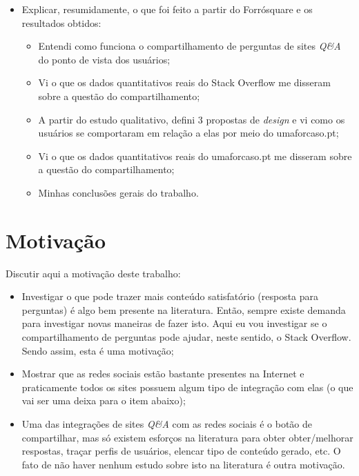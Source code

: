 \begin{itemize}
\begin{itemize}
            \end{itemize}
        \item Explicar, resumidamente, o que foi feito a partir do Forrósquare e os resultados obtidos:
            \begin{itemize}
                \item Entendi como funciona o compartilhamento de perguntas de sites \textit{Q\&A} do ponto de vista dos usuários;
                \item Vi o que os dados quantitativos reais do Stack Overflow me disseram sobre a questão do compartilhamento;
                \item A partir do estudo qualitativo, defini 3 propostas de \textit{design} e vi como os usuários se comportaram em relação a elas por meio do umaforcaso.pt;
                \item Vi o que os dados quantitativos reais do umaforcaso.pt me disseram sobre a questão do compartilhamento;
                \item Minhas conclusões gerais do trabalho.
            \end{itemize}
\end{itemize}

\section{Motivação}
    Discutir aqui a motivação deste trabalho:
    \begin{itemize}
        \item Investigar o que pode trazer mais conteúdo satisfatório (resposta para perguntas) é algo bem presente na literatura. Então, sempre existe demanda para investigar novas maneiras de fazer isto. Aqui eu vou investigar se o compartilhamento de perguntas pode ajudar, neste sentido, o Stack Overflow. Sendo assim, esta é uma motivação;
        \item Mostrar que as redes sociais estão bastante presentes na Internet e praticamente todos os sites possuem algum tipo de integração com elas (o que vai ser uma deixa para o item abaixo);
        \item Uma das integrações de sites \textit{Q\&A} com as redes sociais é o botão de compartilhar, mas só existem esforços na literatura para obter obter/melhorar respostas, traçar perfis de usuários, elencar tipo de conteúdo gerado, etc. O fato de não haver nenhum estudo sobre isto na literatura é outra motivação.
    \end{itemize}
